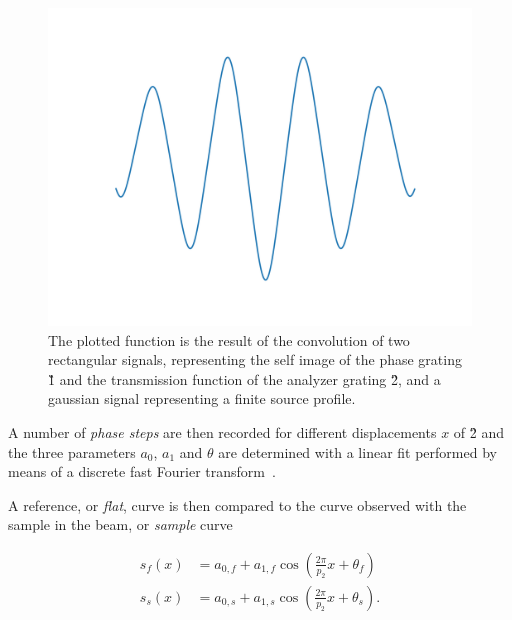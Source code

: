 \begin{figure}[htb]
    \centering
    \includegraphics[width=\textwidth]{gfx/sinusoidal-phase-stepping/sinusoidal-phase-stepping.png}
    \caption[Convolution of two rectangular and a gaussian signal.]{The
        plotted function is the result of the convolution of two rectangular
        signals, representing the self image of the phase grating \G1 and the
        transmission function of the analyzer grating \G2, and a gaussian
    signal representing a finite source profile.}
    \label{fig:phase.stepping.sinusoidal}
\end{figure}


A number of \emph{phase steps} are then recorded for different displacements
$x$ of \G2 and the three parameters $a_0$, $a_1$ and $\theta$ are determined
with a linear fit performed by means of a discrete fast Fourier transform~\parencite{FFTEquivalence}.

A reference, or \emph{flat}, curve is then compared to the curve observed
with the sample in the beam, or \emph{sample} curve

\begin{align}
    s_f(x) &= a_{0,f} + a_{1,f} \cos\left(\frac{2 \pi}{p_2} x + \theta_{f}\right)\\
    s_s(x) &= a_{0,s} + a_{1,s} \cos\left(\frac{2 \pi}{p_2} x +
    \theta_{s}\right).
    \label{eq:flat}
\end{align}


